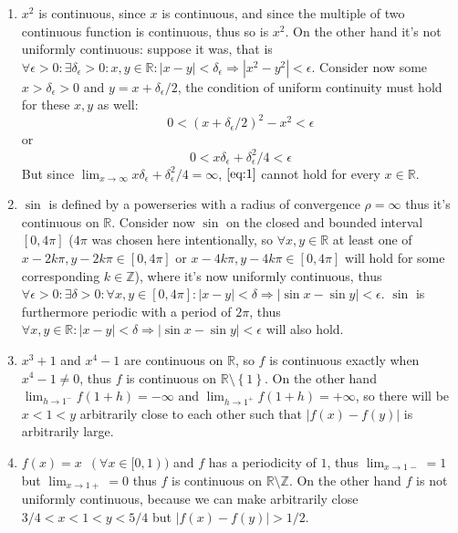 \documentclass[11pt]{article}
\newcommand{\abs}[1]{\left|#1\right|}
\begin{document}
\begin{enumerate}
\begin{enumerate}
    \item $x^2$ is continuous, since $x$ is continuous, and since the multiple of two continuous function is continuous, thus so is $x^2$. On the other hand it's not uniformly continuous: suppose it was, that is $\forall \epsilon > 0\colon \exists \delta_\epsilon > 0\colon x, y \in \mathbb{R}\colon \abs{x - y} < \delta_\epsilon\Rightarrow\abs{x^2 - y^2} < \epsilon$. Consider now some $x > \delta_\epsilon > 0$ and $y = x + \delta_\epsilon/2$, the condition of uniform continuity must hold for these $x, y$ as well: 
        $$0 < (x+\delta_\epsilon/2)^2 - x^2 < \epsilon$$
    or
        \begin{equation}\label{eq:1}0 < x\delta_\epsilon + \delta_\epsilon^2/4 < \epsilon\end{equation}
    But since $\lim_{x\to\infty}x\delta_\epsilon + \delta_\epsilon^2/4 = \infty$, $\eqref{eq:1}$ cannot hold for every $x\in\mathbb{R}$.
    \item 
    $\sin$ is defined by a powerseries with a radius of convergence $\rho = \infty$ thus it's continuous on $\mathbb{R}$. Consider now $\sin$ on the closed and bounded interval $[0, 4\pi]$ ($4\pi$ was chosen here intentionally, so $\forall x, y \in \mathbb{R}$ at least one of  $x-2k\pi, y-2k\pi \in [0, 4\pi]$ or $x-4k\pi, y-4k\pi \in [0, 4\pi]$ will hold for some corresponding $k\in\mathbb{Z}$), where it's now uniformly continuous, thus $\forall \epsilon > 0\colon \exists \delta > 0\colon \forall x, y \in [0, 4\pi]\colon \abs{x - y} < \delta \Rightarrow \abs{\sin{x} - \sin{y}} < \epsilon$. $\sin$ is furthermore periodic with a period of $2\pi$, thus $\forall x, y \in \mathbb{R}\colon \abs{x-y} < \delta \Rightarrow \abs{\sin{x} - \sin{y}} < \epsilon$ will also hold.
    \item $x^3 + 1$ and $x^4-1$ are continuous on $\mathbb{R}$, so $f$ is continuous exactly when $x^4-1 \neq 0$, thus $f$ is continuous on $\mathbb{R}\setminus\left\{1\right\}$. On the other hand $\lim_{h\to1^-}f(1+h) = -\infty$ and $\lim_{h\to1^+}f(1+h) = +\infty$, so there will be $x < 1 < y$ arbitrarily close to each other such that $\abs{f(x) - f(y)}$ is arbitrarily large.
    \item $f(x) = x\phantom{0}(\forall x \in [0, 1))$ and $f$ has a periodicity of $1$, thus $\lim_{x\to1-} = 1$ but $\lim_{x\to1+} = 0$ thus $f$ is continuous on $\mathbb{R} \setminus \mathbb{Z}$. On the other hand $f$ is not uniformly continuous, because we can make arbitrarily close $3/4 < x < 1 < y < 5/4$ but $\abs{f(x) - f(y)} > 1/2$.
\end{enumerate}


\end{enumerate}
\end{document}
